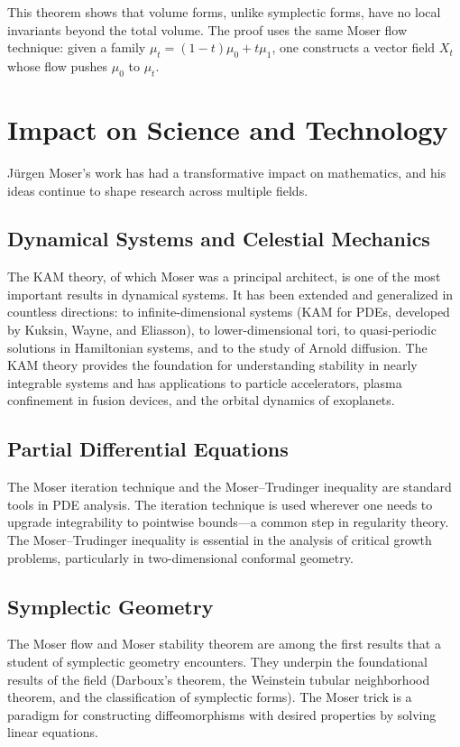 This theorem shows that volume forms, unlike symplectic forms, have no local invariants beyond the total volume. The proof uses the same Moser flow technique: given a family $\mu_t = (1-t)\mu_0 + t\mu_1$, one constructs a vector field $X_t$ whose flow pushes $\mu_0$ to $\mu_t$.

\section{Impact on Science and Technology}

J\"{u}rgen Moser's work has had a transformative impact on mathematics, and his ideas continue to shape research across multiple fields.

\subsection{Dynamical Systems and Celestial Mechanics}

The KAM theory, of which Moser was a principal architect, is one of the most important results in dynamical systems. It has been extended and generalized in countless directions: to infinite-dimensional systems (KAM for PDEs, developed by Kuksin, Wayne, and Eliasson), to lower-dimensional tori, to quasi-periodic solutions in Hamiltonian systems, and to the study of Arnold diffusion. The KAM theory provides the foundation for understanding stability in nearly integrable systems and has applications to particle accelerators, plasma confinement in fusion devices, and the orbital dynamics of exoplanets.

\subsection{Partial Differential Equations}

The Moser iteration technique and the Moser--Trudinger inequality are standard tools in PDE analysis. The iteration technique is used wherever one needs to upgrade integrability to pointwise bounds---a common step in regularity theory. The Moser--Trudinger inequality is essential in the analysis of critical growth problems, particularly in two-dimensional conformal geometry.

\subsection{Symplectic Geometry}

The Moser flow and Moser stability theorem are among the first results that a student of symplectic geometry encounters. They underpin the foundational results of the field (Darboux's theorem, the Weinstein tubular neighborhood theorem, and the classification of symplectic forms). The Moser trick is a paradigm for constructing diffeomorphisms with desired properties by solving linear equations.

